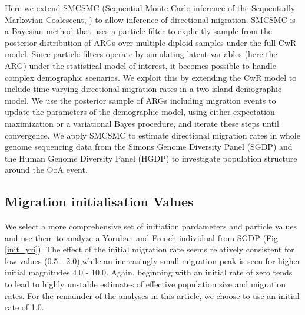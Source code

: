 Here we extend SMCSMC (Sequential Monte Carlo inference of the Sequentially Markovian Coalescent, \cite{Henderson2018}) to allow inference of directional migration.  SMCSMC is a Bayesian method that uses a particle filter to explicitly sample from the posterior distribution of ARGs over multiple diploid samples under the full CwR model.
Since particle filters operate by simulating latent variables (here the ARG) under the statistical model of interest, it becomes possible to handle complex demographic scenarios.  We exploit this by extending the CwR model to include time-varying directional migration rates in a two-island demographic model.  We use the posterior sample of ARGs including migration events to update the parameters of the demographic model, using either expectation-maximization or a variational Bayes procedure, and iterate these steps until convergence.   We apply SMCSMC to estimate directional migration rates in whole genome sequencing data from the Simons Genome Diversity Panel (SGDP) \cite{Mallick2016} and the Human Genome Diversity Panel (HGDP) \cite{Bergstrom2019} to investigate population structure around the OoA event.

\subsection{Migration initialisation Values} \label{ch2:initial}

We select a more comprehensive set of initiation pardameters and particle values and use them to analyze a Yoruban and French individual from SGDP (Fig \ref{init_yri}). The effect of the initial migration rate seems relatively consistent for low values (0.5 - 2.0),while an increasingly small migration peak is seen for higher initial magnitudes 4.0 - 10.0. Again, beginning with an initial rate of zero tends to lead to highly unstable estimates of effective population size and migration rates. For the remainder of the analyses in this article, we choose to use an initial rate of 1.0. 



